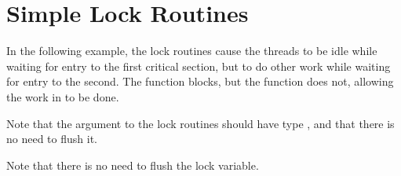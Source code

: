 \pagebreak
\chapter{Simple Lock Routines}
\label{chap:simple_lock}

In the following example, the lock routines cause the threads to be idle while 
waiting for entry to the first critical section, but to do other work while waiting 
for entry to the second. The  function blocks, but the  
function does not, allowing the work in  to be done. 

Note that the argument to the lock routines should have type , 
and that there is no need to flush it. 


Note that there is no need to flush the lock variable. 




